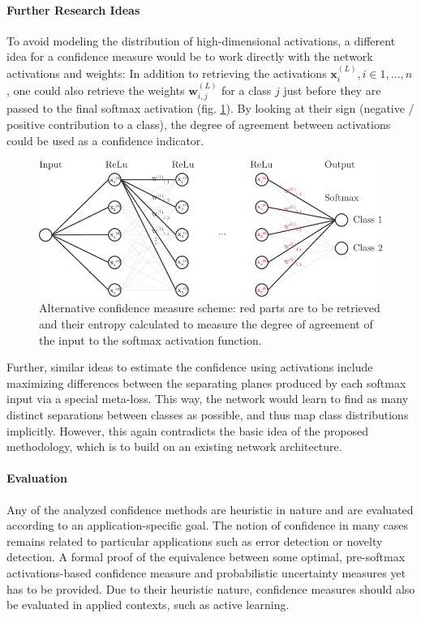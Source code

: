 \documentclass[10pt]{article}
\begin{document}
\paragraph{Further Research Ideas} To avoid modeling the distribution of high-dimensional activations, a different idea for a confidence measure would be to work directly with the network activations and weights: In addition to retrieving the activations $\mathbf{x}^{(L)}_i, i \in 1, ..., n$, one could also retrieve the weights $\mathbf{w}^{(L)}_{i, j}$ for a class $j$ just before they are passed to the final softmax activation (fig. \ref{fig:nn_scheme}). By looking at their sign (negative / positive contribution to a class), the degree of agreement between activations could be used as a confidence indicator.
\begin{figure}[H]
	\centering
	\includegraphics[width=.7\textwidth]{Schema/nn_scheme}
	\caption{Alternative confidence measure scheme: red parts are to be retrieved and their entropy calculated to measure the degree of agreement of the input to the softmax activation function.}
	\label{fig:nn_scheme}
\end{figure}

Further, similar ideas to estimate the confidence using activations include maximizing differences between the separating planes produced by each softmax input via a special meta-loss. This way, the network would learn to find as many distinct separations between classes as possible, and thus map class distributions implicitly. However, this again contradicts the basic idea of the proposed methodology, which is to build on an existing network architecture.

\paragraph{Evaluation} Any of the analyzed confidence methods are heuristic in nature and are evaluated according to an application-specific goal. The notion of confidence in many cases remains related to particular applications such as error detection or novelty detection. A formal proof of the equivalence between some optimal, pre-softmax activations-based confidence measure and probabilistic uncertainty measures yet has to be provided. Due to their heuristic nature, confidence measures should also be evaluated in applied contexts, such as active learning.
\end{document}
